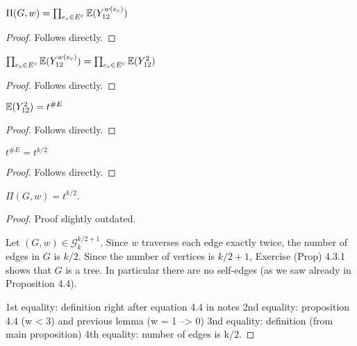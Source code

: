\begin{lemma}
  \label{lem:prod_expansion}
  \notready
  $\Pi(G,w) = \prod_{e_c\in E^c} \mathbb{E}(Y_{12}^{w(e_c)})$
\end{lemma}

\begin{proof}
  \notready
  Follows directly.
\end{proof}

\begin{lemma}
  \label{lem:w_2_case}
  \notready
  $\prod_{e_c\in E^c} \mathbb{E}(Y_{12}^{w(e_c)}) = \prod_{e_c\in E^c} \mathbb{E}(Y_{12}^2)$
\end{lemma}

\begin{proof}
  \notready
  Follows directly.
\end{proof}

\begin{lemma}
  \label{lem:def_t_rewrite}
  \notready
  $\mathbb{E}(Y_{12}^2) = t^{\#E}$
\end{lemma}

\begin{proof}
  \notready
  Follows directly.
\end{proof}

\begin{lemma}
  \label{lem:e_equals_k_over_two}
  \notready
  $t^{\#E} = t^{k/2}$
\end{lemma}

\begin{proof}
  \notready
  Follows directly.
\end{proof}



\begin{proposition}%
  \label{prop:product_g_w_to_exponential}
  \notready
  $\Pi(G,w) = t^{k/2}$.
\end{proposition}

\begin{proof}
  \notready
  Proof slightly outdated.

  Let $(G,w)\in\mathcal{G}^{k/2+1}_k$.  Since $w$ traverses each edge exactly twice, the number of edges in $G$ is $k/2$.  Since the number of vertices is $k/2+1$, Exercise (Prop) 4.3.1 shows that $G$ is a tree.  In particular there are no self-edges (as we saw already in Proposition 4.4).

  1st equality: definition right after equation 4.4 in notes
  2nd equality: proposition 4.4 (w < 3) and previous lemma (w = 1 --> 0)
  3nd equality: definition (from main proposition)
  4th equality: number of edges is k/2.
\end{proof}




